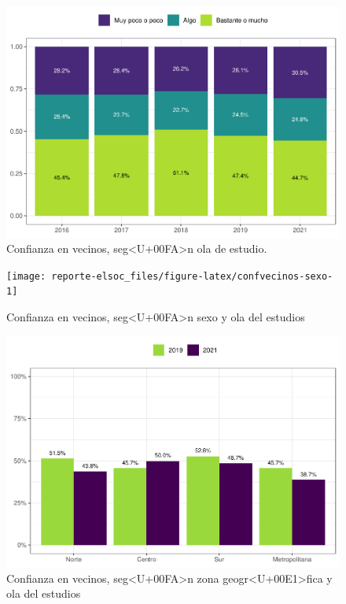 \documentclass[
  12pt,
]{book}
\begin{document}
\begin{figure}

{\centering \includegraphics{reporte-elsoc_files/figure-latex/vecinos-ola-1} 

}

\caption{Confianza en vecinos, seg<U+00FA>n ola de estudio.}\label{fig:vecinos-ola}
\end{figure}

\begin{figure}

{\centering \texttt{[image: reporte-elsoc\_files/figure-latex/confvecinos-sexo-1]} 

}

\caption{Confianza en vecinos, seg<U+00FA>n sexo y ola del estudios}\label{fig:confvecinos-sexo}
\end{figure}

\begin{figure}

{\centering \includegraphics{reporte-elsoc_files/figure-latex/vecinos-zona-1} 

}

\caption{Confianza en vecinos, seg<U+00FA>n zona geogr<U+00E1>fica y ola del estudios}\label{fig:vecinos-zona}
\end{figure}
\end{document}
